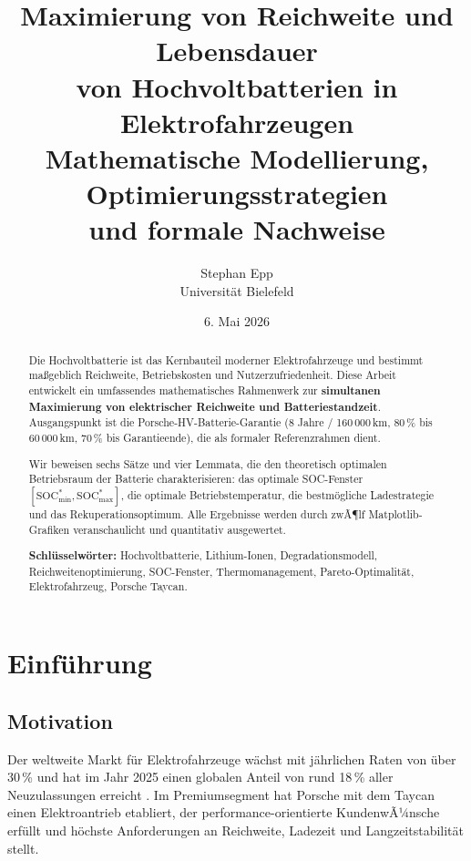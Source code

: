 ﻿\documentclass[a4paper,12pt]{article}
\title{\textbf{Maximierung von Reichweite und Lebensdauer\\
von Hochvoltbatterien in Elektrofahrzeugen}\\[0.5em]
{\large Mathematische Modellierung, Optimierungsstrategien\\
und formale Nachweise}}
\author{Stephan Epp\\[0.3em]
{\small Universit\"at Bielefeld}}
\date{6. Mai 2026}
\theoremstyle{definition}
\begin{document}
\maketitle

\begin{abstract}
\noindent
Die Hochvoltbatterie ist das Kernbauteil moderner Elektrofahrzeuge und bestimmt
ma\ss{}geblich Reichweite, Betriebskosten und Nutzerzufriedenheit.
Diese Arbeit entwickelt ein umfassendes mathematisches Rahmenwerk zur
\textbf{simultanen Maximierung von elektrischer Reichweite und Batteriestandzeit}.
Ausgangspunkt ist die Porsche-HV-Batterie-Garantie (8 Jahre / 160\,000\,km,
80\,\% bis 60\,000\,km, 70\,\% bis Garantieende), die als formaler Referenzrahmen
dient.

Wir beweisen sechs S\"atze und vier Lemmata, die den theoretisch optimalen
Betriebsraum der Batterie charakterisieren: das optimale SOC-Fenster
$[\mathrm{SOC}_{\min}^*, \mathrm{SOC}_{\max}^*]$, die optimale Betriebstemperatur,
die bestm\"ogliche Ladestrategie und das Rekuperationsoptimum.
Alle Ergebnisse werden durch zwÃ¶lf Matplotlib-Grafiken veranschaulicht
und quantitativ ausgewertet.

\medskip
\noindent
\textbf{Schl\"usselw\"orter:} Hochvoltbatterie, Lithium-Ionen, Degradationsmodell,
Reichweitenoptimierung, SOC-Fenster, Thermomanagement, Pareto-Optimalit\"at,
Elektrofahrzeug, Porsche Taycan.
\end{abstract}

\tableofcontents
\newpage

\section{Einf\"uhrung}

\subsection{Motivation}

Der weltweite Markt f\"ur Elektrofahrzeuge w\"achst mit j\"ahrlichen Raten von
\"uber 30\,\% und hat im Jahr 2025 einen globalen Anteil von rund 18\,\%
aller Neuzulassungen erreicht \cite{IEA2025}. Im Premiumsegment hat Porsche
mit dem Taycan einen Elektroantrieb etabliert, der performance-orientierte
KundenwÃ¼nsche erf\"ullt und h\"ochste Anforderungen an Reichweite, Ladezeit
und Langzeitstabilit\"at stellt.
\end{document}
